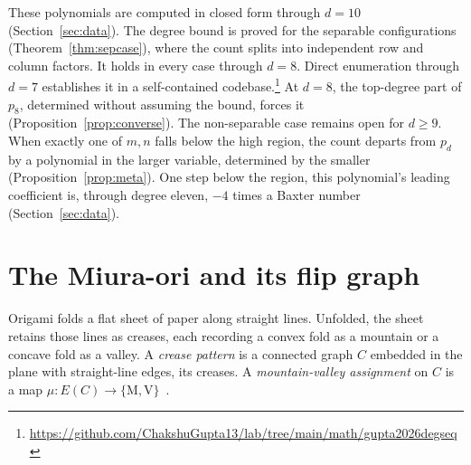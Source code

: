 \documentclass[11pt]{article}
\theoremstyle{definition}
\theoremstyle{remark}
\begin{document}
These polynomials are computed in closed form through $d=10$
(Section~\ref{sec:data}). The degree bound is proved for the separable
configurations (Theorem~\ref{thm:sepcase}), where the count splits into
independent row and column factors. It holds in every case through $d=8$. Direct
enumeration through $d=7$ establishes it in a self-contained
codebase.\footnote{\url{https://github.com/ChakshuGupta13/lab/tree/main/math/gupta2026degseq}}
At $d=8$, the top-degree part of $p_8$, determined without
assuming the bound, forces it (Proposition~\ref{prop:converse}). The
non-separable case remains open for $d\ge9$. When exactly one of $m,n$ falls
below the high region, the count departs from $p_d$ by a polynomial in the
larger variable, determined by the smaller (Proposition~\ref{prop:meta}). One
step below the region, this polynomial's leading coefficient is, through degree
eleven, $-4$ times a Baxter number (Section~\ref{sec:data}).

\section{The Miura-ori and its flip graph}\label{sec:miura}

Origami folds a flat sheet of paper along straight lines. Unfolded, the sheet
retains those lines as creases, each recording a convex fold as a mountain or a
concave fold as a valley. A \emph{crease pattern} is a connected
graph $C$ embedded in the plane with straight-line edges, its creases. A
\emph{mountain-valley assignment} on $C$ is a map
$\mu\colon E(C)\to\{\mathrm{M},\mathrm{V}\}$~\cite{GineproHull2014counting}.
\end{document}
